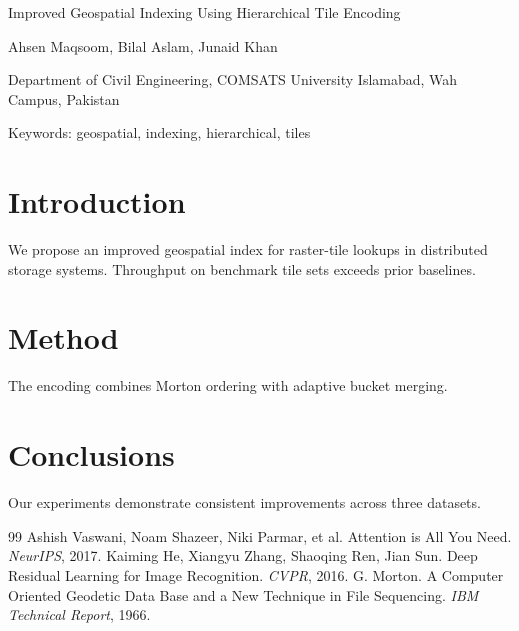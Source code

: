 
Improved Geospatial Indexing Using Hierarchical Tile Encoding

Ahsen Maqsoom, Bilal Aslam, Junaid Khan

Department of Civil Engineering, COMSATS University Islamabad, Wah Campus, Pakistan

Keywords: geospatial, indexing, hierarchical, tiles

\section{Introduction}
We propose an improved geospatial index for raster-tile lookups in distributed
storage systems. Throughput on benchmark tile sets exceeds prior baselines.

\section{Method}
The encoding combines Morton ordering with adaptive bucket merging.

\section{Conclusions}
Our experiments demonstrate consistent improvements across three datasets.

\begin{thebibliography}{99}
 Ashish Vaswani, Noam Shazeer, Niki Parmar, et al. Attention is All You Need. \emph{NeurIPS}, 2017.
 Kaiming He, Xiangyu Zhang, Shaoqing Ren, Jian Sun. Deep Residual Learning for Image Recognition. \emph{CVPR}, 2016.
 G. Morton. A Computer Oriented Geodetic Data Base and a New Technique in File Sequencing. \emph{IBM Technical Report}, 1966.
\end{thebibliography}
